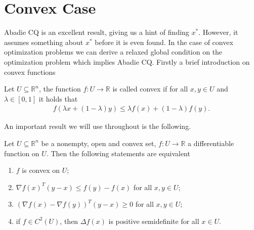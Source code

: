 \section{Convex Case}
Abadie CQ is an excellent result, giving us a hint of finding $x^{*}$.
However, it assumes something about $x^{*}$ before it is even found. In the
case of convex optimization problems we can derive a relaxed global condition
on the optimization problem which implies Abadie CQ. Firstly a brief
introduction on convex functions
\begin{definition}
    Let $U \subseteq \mathbb{R}^{n}$, the function $f: U \to \mathbb{R}$
    is called convex if for all $x, y \in U$ and $\lambda \in [0, 1]$ it
    holds that
    \begin{align}
        f(\lambda x + (1-\lambda)y) \le \lambda f(x) + (1-\lambda)f(y).
    \end{align}
\end{definition}
An important result we will use throughout is the following.
\begin{proposition}
    \label{prop: convexity}
    Let $U \subseteq \mathbb{R}^{n}$ be a nonempty, open and convex set, $f:
    U \to \mathbb{R}$ a differentiable function on $U$. Then the following
    statements are equivalent
    \begin{enumerate}[nosep]
        \item $f$ is convex on $U$;
        \item $\nabla f(x)^{T}(y-x) \le f(y)- f(x)$ for all $x, y \in U$;
        \item $(\nabla f(x) - \nabla f(y))^{T}(y-x)\ge 0$ for all $x, y \in
            U$;
        \item if $f \in C^{2}(U)$, then $\Delta f(x)$ is positive
            semidefinite for all $x \in U$.
    \end{enumerate}
\end{proposition}
